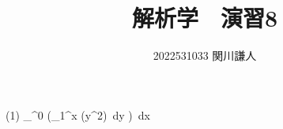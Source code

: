 \documentclass[a4paper,11pt]{ltjsarticle}
\begin{document}
\title{解析学　演習8}
\author{2022531033 関川謙人}
\maketitle
\section{}
(1)
\int_{\pi}^{0} (\int_{1}^{x} \sin (\pi y^{2}) \,dy ) \,dx 
 
\end{document}

